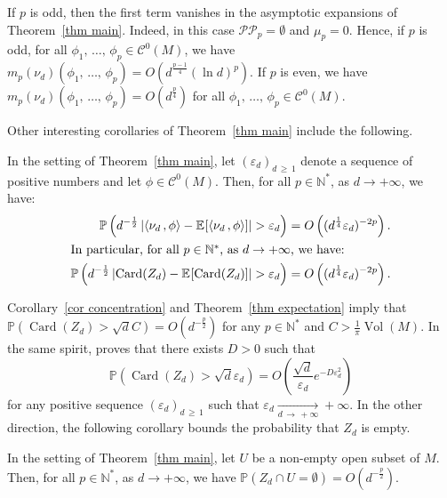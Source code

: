 \documentclass[AHL,Unicode,longabstracts,published]{cedram}
\DeclareMathOperator{\card}{Card}
\DeclareMathOperator{\Vol}{Vol}
\newcommand{\clC}{\mathcal{C}}
\newcommand{\pp}{\mathcal{P\!P}\!}
\newcommand{\N}{\mathbb{N}}
\renewcommand{\P}{\mathbb{P}}
\newcommand{\esp}[2][]{\mathbb{E}_{#1}\!\left[#2 \right]}
\newcommand{\norm}[1]{\left\lvert #1 \right\rvert}
\newcommand{\prsc}[2]{\left\langle #1\,, #2 \right\rangle}
\newcommand{\vol}[1]{\Vol\!\left(#1\right)}
\renewcommand{\epsilon}{\varepsilon}
\renewcommand{\geq}{\geqslant}
\begin{document}
\begin{rema}\label{rem main thm}
If $p$ is odd, then the first term vanishes in the asymptotic expansions of Theorem~\ref{thm main}. Indeed, in this case $\pp_p = \emptyset$ and $\mu_p = 0$. Hence, if $p$ is odd, for all $\phi_1,\,\dots,\,\phi_p \in \clC^0(M)$, we have $m_p(\nu_d)(\phi_1,\,\dots,\,\phi_p) = O(d^{\frac{p-1}{4}}(\ln d)^p)$. If $p$ is even, we have $m_p(\nu_d)(\phi_1,\,\dots,\,\phi_p) = O(d^{\frac{p}{4}})$ for all $\phi_1,\,\dots,\,\phi_p \in \clC^0(M)$.
\end{rema}

Other interesting corollaries of Theorem~\ref{thm main} include the following.

\begin{coro}\label{cor concentration}
In the setting of Theorem~\ref{thm main}, let $(\epsilon_d)_{d\,\geq\,1}$ denote a sequence of positive numbers and let $\phi \in \clC^0(M)$. Then, for all $p \in \N^*$, as $d \to +\infty$, we have:
\begin{align*}
\P\left(d^{-\frac{1}{2}}\norm{\prsc{\nu_d}{\phi} - \esp{\prsc{\nu_d}{\phi}}} > \epsilon_d \right) &= O\left((d^\frac{1}{4}\epsilon_d)^{-2p}\right).
\\
\intertext{In particular, for all $p \in \N^*$, as $d \to +\infty$, we have:}
\P\left(d^{-\frac{1}{2}}\norm{\card(Z_d) - \esp{\card(Z_d)}} > \epsilon_d \right) &= O\left((d^\frac{1}{4}\epsilon_d)^{-2p}\right).
\end{align*}
\end{coro}

Corollary~\ref{cor concentration} and Theorem~\ref{thm expectation} imply that $\P(\card(Z_d) > \sqrt{d}C)=O(d^{-\frac{p}{2}})$ for any $p \in \N^*$ and $C > \frac{1}{\pi}\vol{M}$. In the same spirit, \cite[Theorem~2]{GW2011} proves that there exists $D>0$ such that
\[
\P\left(\card(Z_d) > \sqrt{d}\epsilon_d\right)=O\!\left(\frac{\sqrt{d}}{\epsilon_d}e^{-D\epsilon_d^2}\right)
\]
for any positive sequence $(\epsilon_d)_{d\,\geq\,1}$ such that $\epsilon_d \xrightarrow[d\,\to\,+\infty]{} +\infty$. In the other direction, the following corollary bounds the probability that $Z_d$ is empty.

\begin{coro}\label{cor hole probability}
In the setting of Theorem~\ref{thm main}, let $U$ be a non-empty open subset of $M$. Then, for all $p \in \N^*$, as $d \to +\infty$, we have $\P(Z_d \cap U = \emptyset) = O(d^{-\frac{p}{2}})$.
\end{coro}
\end{document}
